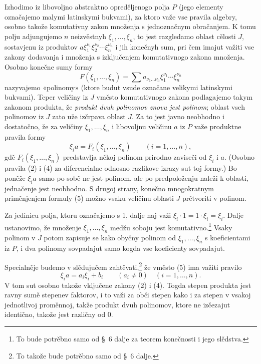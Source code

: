 \documentclass[11pt]{article}
\begin{document}
Izhodimo iz libovoljno abstraktno opreděljenogo polja \(P\) (jego elementy označajemo malymi latinskymi bukvami), za ktoro važe vse pravila algebry, osobno takože komutativny zakon množenja s jednoznačnym obračanjem. K tomu polju adjungujemo \(n\) neizvěstnyh \(\xi_1,\ldots,\xi_n\), to jest razgledamo oblast cělosti \(J\), sostavjenu iz produktov \(a\xi_1^{\nu_1}\xi_2^{\nu_2}\cdots\xi_n^{\nu_n}\) i jih konečnyh sum, pri čem imajut važiti vse zakony dodavanja i množenja s izključenjem komutativnogo zakona množenja. Osobno konečne sumy formy
\[
 F(\xi_1,\ldots,\xi_n)=\sum a_{\nu_1\ldots\nu_n}\xi_1^{\nu_1}\cdots\xi_n^{\nu_n}
\]
nazyvajemo «polinomy» (ktore budut vsude označane velikymi latinskymi bukvami). Teper veličiny iz \(J\) vměsto komutativnogo zakona podlagajemo takym zakonom produkta, že \textit{produkt dvuh polinomov znovu jest polinom}; oblast vseh polinomov iz \(J\) zato uže izčrpava oblast \(J\). Za to jest javno neobhodno i dostatočno, že za veličiny \(\xi_1,\ldots,\xi_n\) i libovoljnu veličinu \(a\) iz \(P\) važe produktne pravila formy
\begin{equation}
 \xi_i a=F_i(\xi_1,\ldots,\xi_n)\qquad (i=1,\ldots,n),
\tag{5}
\end{equation}
gdě \(F_i(\xi_1,\ldots,\xi_n)\) predstavlja někoj polinom prirodno zaviseči od \(\xi_i\) i \(a\). (Osobno pravila (2) i (4) za diferencialne odnosno razlikove izrazy sut toj formy.) Bo poněže \(\xi_i a\) samo po sobě ne jest polinom, ale po predpoloženju naleži k oblasti, jednačenje jest neobhodno. S drugoj strany, konečno mnogokratnym priměnjenjem formuly (5) možno vsaku veličinu oblasti \(J\) prětvoriti v polinom.

Za jedinicu polja, ktoru označajemo s 1, dalje naj važi \(\xi_i\cdot1=1\cdot\xi_i=\xi_i\). Dalje ustanovimo, že množenje \(\xi_1,\ldots,\xi_n\) medžu soboju jest komutativno.\footnote{To bude potrěbno samo od \S~6 dalje za teorem konečnosti i jego slědstva.} Vsaky polinom v \(J\) potom zapisuje se kako obyčny polinom od \(\xi_1,\ldots,\xi_n\) s koeficientami iz \(P\), i dva polinomy sovpadajut samo kogda vse koeficienty sovpadajut.

Specialněje budemo v slědujučem zahtěvati,\footnote{To takože bude potrěbno samo od \S~6 dalje.} že vměsto (5) ima važiti pravilo
\begin{equation}
 \xi_i a=a_i\xi_i+b_i\qquad (a_i\ne0)\quad(i=1,\ldots,n).
\tag{6}
\end{equation}
V tom sut osobno takože vključene zakony (2) i (4). Togda stepen produkta jest ravny sumě stepenev faktorov, i to važi za obči stepen kako i za stepen v vsakoj jednotlivoj proměnnoj, takže produkt dvuh polinomov, ktore ne izčezajut identično, takože jest različny od 0.
\end{document}
